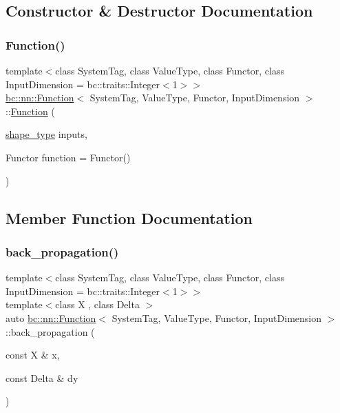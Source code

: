 \subsection{Constructor \& Destructor Documentation}
\mbox{\label{structbc_1_1nn_1_1Function_a276e54e414ef1b95297d04bb1881b054}} 
\subsubsection{\texorpdfstring{Function()}{Function()}}
{\footnotesize\ttfamily template$<$class System\+Tag, class Value\+Type, class Functor, class Input\+Dimension = bc\+::traits\+::\+Integer$<$1$>$$>$ \\
\hyperlink{structbc_1_1nn_1_1Function}{bc\+::nn\+::\+Function}$<$ System\+Tag, Value\+Type, Functor, Input\+Dimension $>$\+::\hyperlink{structbc_1_1nn_1_1Function}{Function} (\begin{DoxyParamCaption}\item[{\hyperlink{structbc_1_1nn_1_1Function_ab8cbdaad20a0270b2555a91676a79932}{shape\+\_\+type}}]{inputs,  }\item[{Functor}]{function = {\ttfamily Functor()} }\end{DoxyParamCaption})\hspace{0.3cm}{\ttfamily [inline]}}



\subsection{Member Function Documentation}
\mbox{\label{structbc_1_1nn_1_1Function_a3e07048b3c63a0625f447d37002e49b2}} 
\subsubsection{\texorpdfstring{back\+\_\+propagation()}{back\_propagation()}}
{\footnotesize\ttfamily template$<$class System\+Tag, class Value\+Type, class Functor, class Input\+Dimension = bc\+::traits\+::\+Integer$<$1$>$$>$ \\
template$<$class X , class Delta $>$ \\
auto \hyperlink{structbc_1_1nn_1_1Function}{bc\+::nn\+::\+Function}$<$ System\+Tag, Value\+Type, Functor, Input\+Dimension $>$\+::back\+\_\+propagation (\begin{DoxyParamCaption}\item[{const X \&}]{x,  }\item[{const Delta \&}]{dy }\end{DoxyParamCaption})\hspace{0.3cm}{\ttfamily [inline]}}

